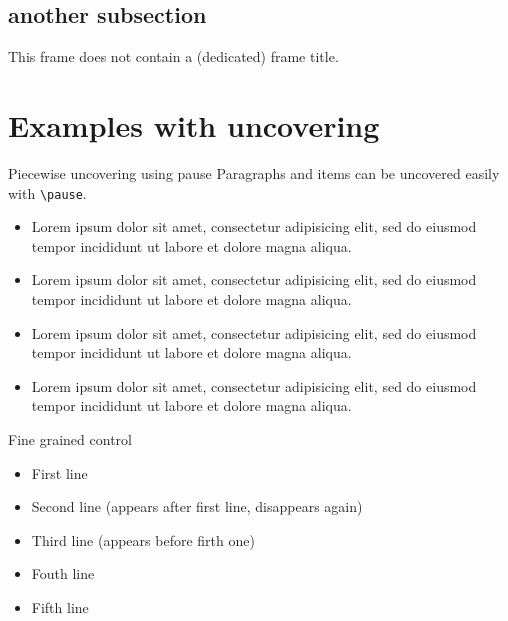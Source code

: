 \documentclass[]{beamer}
\begin{document}
\subsection{another subsection}

\begin{frame}
  This frame does not contain a (dedicated) frame title.
\end{frame}

\section{Examples with uncovering}

\begin{frame}{Piecewise uncovering using pause}
  Paragraphs and items can be uncovered easily with \texttt{\textbackslash pause}.
  \pause
  \begin{itemize}
    \item Lorem ipsum dolor sit amet, consectetur adipisicing elit, sed do eiusmod tempor incididunt ut labore et dolore magna aliqua. 
      \pause
    \item Lorem ipsum dolor sit amet, consectetur adipisicing elit, sed do eiusmod tempor incididunt ut labore et dolore magna aliqua. 
      \pause
    \item Lorem ipsum dolor sit amet, consectetur adipisicing elit, sed do eiusmod tempor incididunt ut labore et dolore magna aliqua. 
      \pause
    \item Lorem ipsum dolor sit amet, consectetur adipisicing elit, sed do eiusmod tempor incididunt ut labore et dolore magna aliqua. 
  \end{itemize}
\end{frame}

\begin{frame}{Fine grained control}
  \begin{itemize}
    \item<1-> First line
    \item<2>  Second line (appears after first line, disappears again)
    \item<3-4> Third line (appears before firth one)
    \item<4-> Fouth line
    \item<5-> Fifth line
  \end{itemize}

\end{frame}
\end{document}
